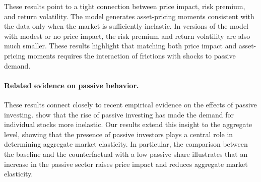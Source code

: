 \documentclass[12pt,english]{article}
\begin{document}
These results point to a tight connection between price impact, risk premium, and return volatility.
The model generates asset-pricing moments consistent with the data only when the market is sufficiently inelastic.
In versions of the model with modest or no price impact, the risk premium and return volatility are also much smaller.
These results highlight that matching both price impact and asset-pricing moments requires the interaction of frictions with shocks to passive demand.

\begin{table}[!t]
    \centering
    \resizebox{\linewidth}{!}{}
    \vspace{2mm}
    \caption{\textbf{Counterfactual experiments.}\\
    This table reports annualized model-implied moments for the baseline economy and five counterfactuals.
    \textit{No leverage constraints} sets $\overline{\sigma}=10{,}000$, so leverage constraints are slack.
    \textit{No preference heterogeneity} sets $\gamma_c=\gamma_p=\gamma_u=6.15$, eliminating heterogeneity in risk aversion, combined with the slack leverage constraint.
    \textit{High passive portfolio share} sets $\overline{\alpha}=1$.
    \textit{Low passive population share} reduces the passive sector mass (via a lower $\omega_0$) while increasing the mass of the unconstrained sector.
    \textit{Flows uncorrelated with fundamentals} sets $\nu_p=0$, so passive-demand shocks are orthogonal to fundamentals.
    All other parameters are as in Table~\ref{tab:calib}.
    Price impacts PI ($Y$) and PI ($D$) denote the slope of the regression in equation~\eqref{eq:price_impact_regression} for the endowment and dividend claim, respectively.
    Conditional price impact restricts the regression to ``bad states'' in which $(P/D)_t$ is below its $25$th percentile.
    The discount-rate coefficient $\beta_r$ reports the share of the variance of the log price--dividend ratio attributable to discount-rate news at a $40$-quarter horizon.
    The variable $\Gamma$ reports the unconditional mean of the wealth-weighted harmonic mean of the risk aversion parameters.
    }\label{tab:counterfactual_comparison}

\end{table}

\paragraph{Related evidence on passive behavior.} 
These results connect closely to recent empirical evidence on the effects of passive investing.
\citet{HHM/2021} show that the rise of passive investing has made the demand for individual stocks more inelastic.
Our results extend this insight to the aggregate level, showing that the presence of passive investors plays a central role in determining aggregate market elasticity.
In particular, the comparison between the baseline and the counterfactual with a low passive share illustrates that an increase in the passive sector raises price impact and reduces aggregate market elasticity.
\end{document}
